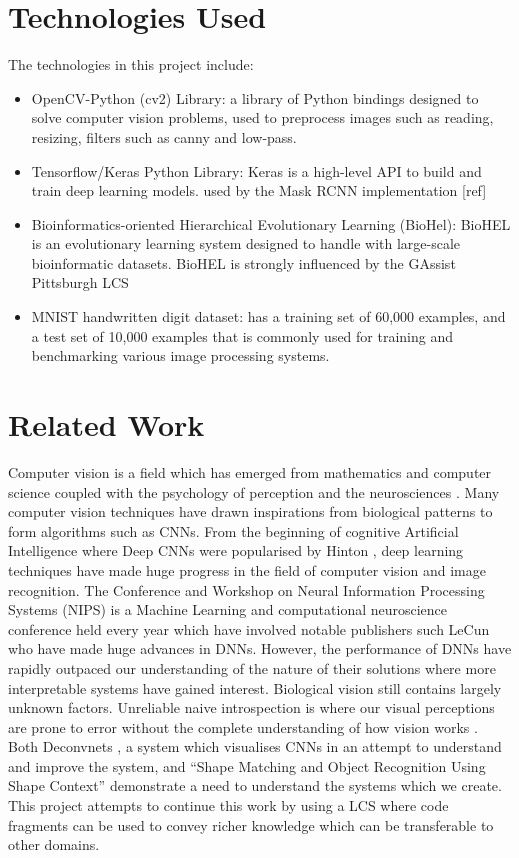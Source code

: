 \section{Technologies Used}
The technologies in this project include:
\begin{itemize}
\item OpenCV-Python (cv2) Library: a library of Python bindings designed to solve computer vision problems, used to preprocess images such as reading, resizing, filters such as canny and low-pass. 
\item Tensorflow/Keras Python Library: Keras is a high-level API to build and train deep learning models. used by the Mask RCNN implementation [ref]
\item Bioinformatics-oriented Hierarchical Evolutionary Learning (BioHel): BioHEL is an evolutionary learning system designed to handle with large-scale bioinformatic datasets. BioHEL is strongly influenced by the GAssist Pittsburgh LCS
\item MNIST handwritten digit dataset: has a training set of 60,000 examples, and a test set of 10,000 examples  that is commonly used for training and benchmarking various image processing systems.
\end{itemize}

\section{Related Work}
Computer vision is a field which has emerged from mathematics and computer science coupled with the psychology of perception and the neurosciences \cite{hartley2003multiple}. Many computer vision techniques have drawn inspirations from biological patterns to form algorithms such as CNNs.  From the beginning of cognitive Artificial Intelligence where Deep CNNs were popularised by Hinton  \cite{krizhevsky2012imagenet}, deep learning techniques have made huge progress in the field of computer vision and image recognition. The Conference and Workshop on Neural Information Processing Systems (NIPS) is a Machine Learning and computational neuroscience conference held every year which have involved notable publishers such LeCun \cite{lecun2015deep} who have made huge advances in DNNs. However, the performance of DNNs have rapidly outpaced our understanding of the nature of their solutions where more interpretable systems have gained interest. Biological vision still contains largely unknown factors. Unreliable naive introspection is where our visual perceptions are prone to error without the complete understanding of how vision works \cite{hartley2003multiple}. Both Deconvnets \cite{zeiler2014visualizing}, a system which visualises CNNs in an attempt to understand and improve the system, and ``Shape Matching and Object Recognition Using Shape Context'' \cite{belongie2002shape} demonstrate a need to understand the systems which we create. This project attempts to continue this work by using a LCS where code fragments can be used to convey richer knowledge which can be transferable to other domains.

